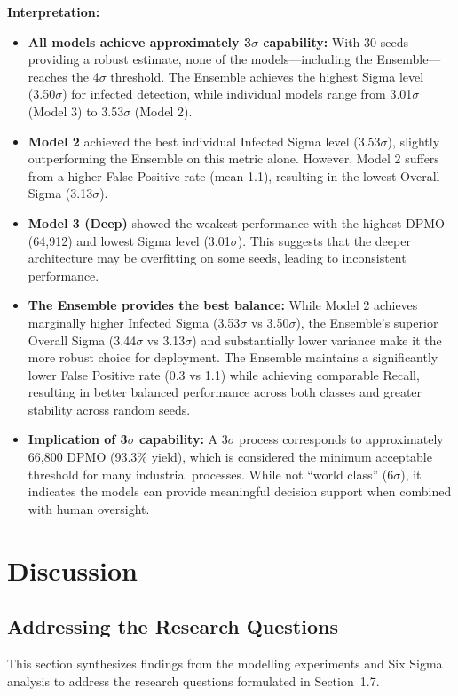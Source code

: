 \documentclass[12pt,a4paper]{article}
\begin{document}
\textbf{Interpretation:}
\begin{itemize}
    \item \textbf{All models achieve approximately 3$\sigma$ capability:} With 30 seeds providing a robust estimate, none of the models---including the Ensemble---reaches the 4$\sigma$ threshold. The Ensemble achieves the highest Sigma level (3.50$\sigma$) for infected detection, while individual models range from 3.01$\sigma$ (Model 3) to 3.53$\sigma$ (Model 2).
    \item \textbf{Model 2} achieved the best individual Infected Sigma level (3.53$\sigma$), slightly outperforming the Ensemble on this metric alone. However, Model 2 suffers from a higher False Positive rate (mean 1.1), resulting in the lowest Overall Sigma (3.13$\sigma$).
    \item \textbf{Model 3 (Deep)} showed the weakest performance with the highest DPMO (64,912) and lowest Sigma level (3.01$\sigma$). This suggests that the deeper architecture may be overfitting on some seeds, leading to inconsistent performance.
    \item \textbf{The Ensemble provides the best balance:} While Model 2 achieves marginally higher Infected Sigma (3.53$\sigma$ vs 3.50$\sigma$), the Ensemble's superior Overall Sigma (3.44$\sigma$ vs 3.13$\sigma$) and substantially lower variance make it the more robust choice for deployment. The Ensemble maintains a significantly lower False Positive rate (0.3 vs 1.1) while achieving comparable Recall, resulting in better balanced performance across both classes and greater stability across random seeds.
    \item \textbf{Implication of 3$\sigma$ capability:} A 3$\sigma$ process corresponds to approximately 66,800 DPMO (93.3\% yield), which is considered the minimum acceptable threshold for many industrial processes. While not ``world class'' (6$\sigma$), it indicates the models can provide meaningful decision support when combined with human oversight.
\end{itemize}

\section{Discussion}

\subsection{Addressing the Research Questions}
This section synthesizes findings from the modelling experiments and Six Sigma analysis to address the research questions formulated in Section~1.7.
\end{document}
